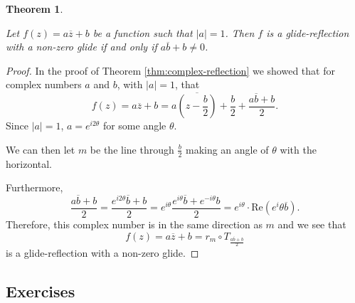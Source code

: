 \documentclass[
]{book}
\newtheorem{theorem}{Theorem}[chapter]
\theoremstyle{definition}
\theoremstyle{definition}
\theoremstyle{definition}
\theoremstyle{definition}
\theoremstyle{remark}
\begin{document}
\begin{theorem}
\protect\hypertarget{thm:unlabeled-div-283}{}\label{thm:unlabeled-div-283}

Let \(f(z)=a\overline{z} + b\) be a function such that \(|a|=1\). Then \(f\) is a glide-reflection with a non-zero glide if and only if \(a\overline{b}+b\neq 0\).

\end{theorem}

\begin{proof}

In the proof of Theorem \ref{thm:complex-reflection} we showed that for complex numbers \(a\) and \(b\), with \(|a|=1\), that
\[f(z)=a\overline{z}+b =  a \overline{ \left( z-\frac{b}{2}\right)} + \frac{b}{2} + \frac{a\overline{b}+b}{2}.\]
Since \(|a|=1\), \(a = e^{i2 \theta}\) for some angle \(\theta\).

We can then let \(m\) be the line through \(\frac{b}{2}\) making an angle of \(\theta\) with the horizontal.

Furthermore,
\[\frac{a\overline{b}+b}{2} = \frac{e^{i2\theta}\overline{b} + b}{2} = e^{i\theta} \frac{ e^{i \theta} \overline{b} + e^{-i\theta} b}{2} = e^{i \theta} \cdot \mbox{Re}\left( e^i \theta \overline{b}\right).\]
Therefore, this complex number is in the same direction as \(m\) and we see that
\[f(z)=a \overline{z} + b = r_m \circ T_{\frac{a\overline{b}+b}{2}}\] is a glide-reflection with a non-zero glide.

\end{proof}

\hypertarget{exercises-55}{%
\subsection{Exercises}\label{exercises-55}}
\end{document}
